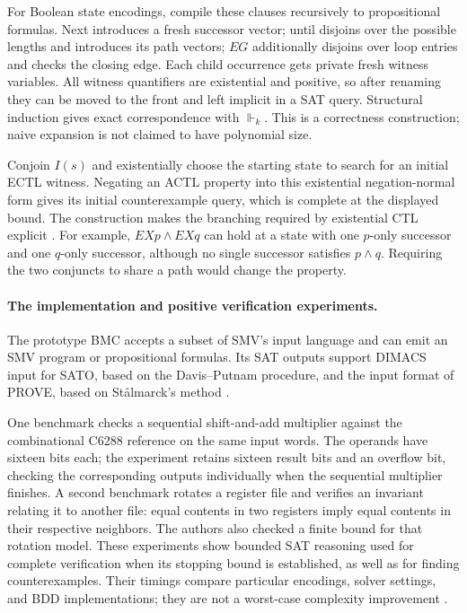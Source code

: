 For Boolean state encodings, compile these clauses
recursively to propositional formulas. Next introduces
a fresh successor vector; until disjoins over the
possible lengths and introduces its path vectors;
\(EG\) additionally disjoins over loop entries and
checks the closing edge. Each child occurrence gets
private fresh witness variables. All witness quantifiers
are existential and positive, so after renaming they
can be moved to the front and left implicit in a
SAT query. Structural induction gives exact correspondence
with \(\Vdash_k\). This is a correctness construction;
naive expansion is not claimed to have polynomial size.

Conjoin \(I(s)\) and existentially choose the starting
state to search for an initial ECTL witness. Negating
an ACTL property into this existential negation-normal
form gives its initial counterexample query, which is
complete at the displayed bound. The construction
makes the branching required by existential CTL
explicit \cite[\S5.1]{BiereCimattiClarkeZhu1999}.
For example, \(EXp\land EXq\) can hold at a state
with one \(p\)-only successor and one \(q\)-only successor,
although no single successor satisfies \(p\land q\).
Requiring the two conjuncts to share a path would
change the property.

\paragraph{The implementation and positive verification experiments.}
\label{sec:p09-n-c-017-biere-positive-experiments}
The prototype \textsc{BMC} accepts a subset of SMV's input
language and can emit an SMV program or propositional formulas.
Its SAT outputs support DIMACS input for \textsc{SATO}, based on
the Davis--Putnam procedure, and the input format of
\textsc{PROVE}, based on St\aa lmarck's method
\cite[\S6]{BiereCimattiClarkeZhu1999}.

One benchmark checks a sequential shift-and-add multiplier
against the combinational C6288 reference on the same input
words. The operands have sixteen bits each; the experiment
retains sixteen result bits and an overflow bit, checking the
corresponding outputs individually when the sequential
multiplier finishes. A second benchmark rotates a register
file and verifies an invariant relating it to another file:
equal contents in two registers imply equal contents in their
respective neighbors. The authors also checked a finite bound
for that rotation model. These experiments show bounded SAT
reasoning used for complete verification when its stopping
bound is established, as well as for finding counterexamples.
Their timings compare particular encodings, solver settings,
and BDD implementations; they are not a worst-case complexity
improvement \cite[\S6 and tables~1--2]{BiereCimattiClarkeZhu1999}.

